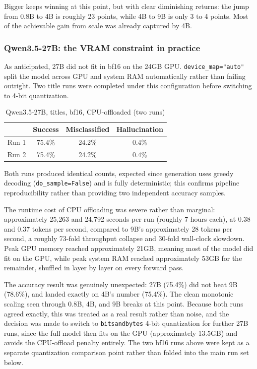 Bigger keeps winning at this point, but with clear diminishing returns: the jump from 0.8B to 4B is roughly 23 points, while 4B to 9B is only 3 to 4 points. Most of the achievable gain from scale was already captured by 4B.

\subsubsection{Qwen3.5-27B: the VRAM constraint in practice}

As anticipated, 27B did not fit in bf16 on the 24GB GPU. \texttt{device\_map="auto"} split the model across GPU and system RAM automatically rather than failing outright. Two title runs were completed under this configuration before switching to 4-bit quantization.

\begin{table}[h]
\centering
\caption{Qwen3.5-27B, titles, bf16, CPU-offloaded (two runs)}
\label{tab:qwen35-27b-bf16}
\begin{tabular}{lccc}
\toprule
 & Success & Misclassified & Hallucination \\
\midrule
Run 1 & 75.4\% & 24.2\% & 0.4\% \\
Run 2 & 75.4\% & 24.2\% & 0.4\% \\
\bottomrule
\end{tabular}
\end{table}

Both runs produced identical counts, expected since generation uses greedy decoding (\texttt{do\_sample=False}) and is fully deterministic; this confirms pipeline reproducibility rather than providing two independent accuracy samples.

The runtime cost of CPU offloading was severe rather than marginal: approximately 25{,}263 and 24{,}792 seconds per run (roughly 7 hours each), at 0.38 and 0.37 tokens per second, compared to 9B's approximately 28 tokens per second, a roughly 73-fold throughput collapse and 30-fold wall-clock slowdown. Peak GPU memory reached approximately 21GB, meaning most of the model did fit on the GPU, while peak system RAM reached approximately 53GB for the remainder, shuffled in layer by layer on every forward pass.

The accuracy result was genuinely unexpected: 27B (75.4\%) did not beat 9B (78.6\%), and landed exactly on 4B's number (75.4\%). The clean monotonic scaling seen through 0.8B, 4B, and 9B breaks at this point. Because both runs agreed exactly, this was treated as a real result rather than noise, and the decision was made to switch to \texttt{bitsandbytes} 4-bit quantization for further 27B runs, since the full model then fits on the GPU (approximately 13.5GB) and avoids the CPU-offload penalty entirely. The two bf16 runs above were kept as a separate quantization comparison point rather than folded into the main run set below.

